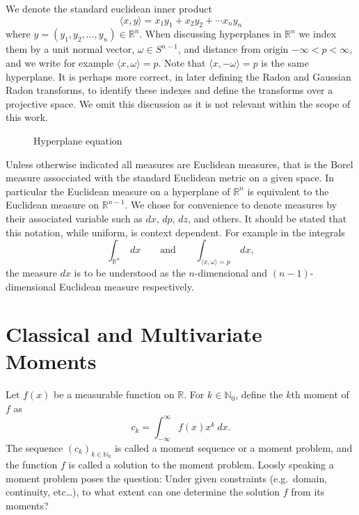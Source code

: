 \documentclass{amsart}
\theoremstyle{remark}
\numberwithin{equation}{section}
\newcommand{\RR}{\mathbb{R}}
\newcommand{\NN}{\mathbb{N}}
\begin{document}
We denote the standard euclidean inner product
\[
    \langle x,y \rangle = x_1y_1 + x_2y_2 + \cdots x_n y_n
\]
where $y = (y_1, y_2, \ldots, y_n) \in \RR^n$. When discussing hyperplanes in $\RR^n$ we index them by a unit normal vector, $\omega \in S^{n-1}$, and distance from origin $-\infty < p < \infty$, and we write for example $\langle x, \omega \rangle = p$. Note that $\langle x, -\omega \rangle = p$ is the same hyperplane. It is perhaps more correct, in later defining the Radon and Gaussian Radon transforms, to identify these indexes and define the transforms over a projective space. We omit this discussion as it is not relevant within the scope of this work.
\begin{figure}[h]
    \caption{Hyperplane equation}\label{fig:HypEq}
\end{figure}

Unless otherwise indicated all measures are Euclidean measures, that is the Borel measure assocciated with the standard Euclidean metric on a given space. In particular the Euclidean measure on a hyperplane of $\RR^n$ is equivalent to the Euclidean measure on $\RR^{n-1}$. We chose for convenience to denote measures by their associated variable such as $dx$, $dp$, $dz$, and others. It should be stated that this notation, while uniform, is context dependent. For example in the integrals
\[
    \int_{\RR^n}~dx \qquad \text{and} \qquad \int_{\langle x, \omega\rangle = p} ~dx,
\]
the measure $dx$ is to be understood as the $n$-dimensional and $(n-1)$-dimensional Euclidean measure respectively.

\newpage
\section{Classical and Multivariate Moments}
Let $f(x)$ be a measurable function on $\RR$. For $k \in \NN_0$, define the $k$th moment of $f$ as
\[
    c_k = \int_{-\infty}^\infty f(x)x^k ~dx.
\]
The sequence ${(c_k)}_{k \in \NN_0}$ is called a moment sequence or a moment problem, and the function $f$ is called a solution to the moment problem. Loosly speaking a moment problem poses the question: Under given constraints (e.g.\ domain, continuity, etc\ldots), to what extent can one determine the solution $f$ from its moments?
\end{document}
